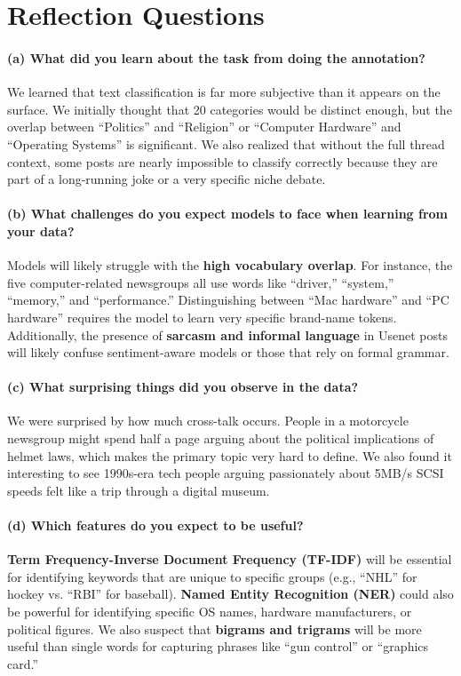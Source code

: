 \documentclass{article}
\begin{document}
\section{Reflection Questions}

\paragraph{(a) What did you learn about the task from doing the annotation?}
We learned that text classification is far more subjective than it appears on the surface. We initially thought that 20 categories would be distinct enough, but the overlap between ``Politics'' and ``Religion'' or ``Computer Hardware'' and ``Operating Systems'' is significant. We also realized that without the full thread context, some posts are nearly impossible to classify correctly because they are part of a long-running joke or a very specific niche debate.

\paragraph{(b) What challenges do you expect models to face when learning from your data?}
Models will likely struggle with the \textbf{high vocabulary overlap}. For instance, the five computer-related newsgroups all use words like ``driver,'' ``system,'' ``memory,'' and ``performance.'' Distinguishing between ``Mac hardware'' and ``PC hardware'' requires the model to learn very specific brand-name tokens. Additionally, the presence of \textbf{sarcasm and informal language} in Usenet posts will likely confuse sentiment-aware models or those that rely on formal grammar.

\paragraph{(c) What surprising things did you observe in the data?}
We were surprised by how much cross-talk occurs. People in a motorcycle newsgroup might spend half a page arguing about the political implications of helmet laws, which makes the primary topic very hard to define. We also found it interesting to see 1990s-era tech people arguing passionately about 5MB/s SCSI speeds felt like a trip through a digital museum.

\paragraph{(d) Which features do you expect to be useful?}
\textbf{Term Frequency-Inverse Document Frequency (TF-IDF)} will be essential for identifying keywords that are unique to specific groups (e.g., ``NHL'' for hockey vs. ``RBI'' for baseball). \textbf{Named Entity Recognition (NER)} could also be powerful for identifying specific OS names, hardware manufacturers, or political figures. We also suspect that \textbf{bigrams and trigrams} will be more useful than single words for capturing phrases like ``gun control'' or ``graphics card.''
\end{document}
